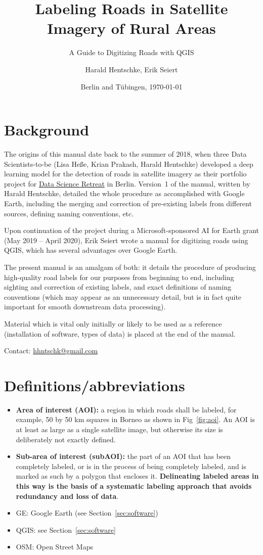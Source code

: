 \documentclass[12pt,a4paper]{scrartcl}
\title{Labeling Roads in Satellite Imagery of Rural Areas}
\subtitle{A Guide to Digitizing Roads with QGIS}
\author{Harald Hentschke, Erik Seiert}
\date{Berlin and Tübingen, \today{}}
\begin{document}
\maketitle
\newpage

\tableofcontents
\newpage

\section{Background} 
The origins of this manual date back to the summer of 2018, when three Data Scientists-to-be (Lisa He\ss e, Krian Prakash, Harald Hentschke) developed a deep learning model for the detection of roads in satellite imagery as their portfolio project for \href{https://www.datascienceretreat.com/}{Data Science Retreat} in Berlin. Version~1 of the manual, written by Harald Hentschke, detailed the whole procedure as accomplished with Google Earth, including the merging and correction of pre-existing labels from different sources, defining naming conventions, etc.

Upon continuation of the project during a Microsoft-sponsored AI for Earth grant (May 2019 -- April 2020), Erik Seiert wrote a manual for digitizing roads using QGIS, which has several advantages over Google Earth. 

The present manual is an amalgam of both: it details the procedure of producing high-quality road labels for our purposes from beginning to end, including sighting and correction of existing labels, and exact definitions of naming conventions (which may appear as an unnecessary detail, but is in fact quite important for smooth downstream data processing).

Material which is vital only initially or likely to be used as a reference (installation of software, types of data) is placed at the end of the manual.

Contact: \url{hhntschk@gmail.com}

\section{Definitions/abbreviations}
\begin{itemize}
	\item \textbf{Area of interest (AOI):} a region in which roads shall be labeled, for example, 50 by 50 km squares in Borneo as shown in Fig~\ref{fig:aoi}. An AOI is at least as large as a single satellite image, but otherwise its size is deliberately not exactly defined.
	\item \textbf{Sub-area of interest (subAOI):} the part of an AOI that has been completely labeled, or is in the process of being completely labeled, and is marked as such by a polygon that encloses it. \textbf{Delineating labeled areas in this way is the basis of a systematic labeling approach that avoids redundancy and loss of data}.
	\item GE: Google Earth (see Section~\ref{sec:software})
	\item QGIS: see Section~\ref{sec:software}
	\item OSM: Open Street Maps
\end{itemize}
\end{document}
